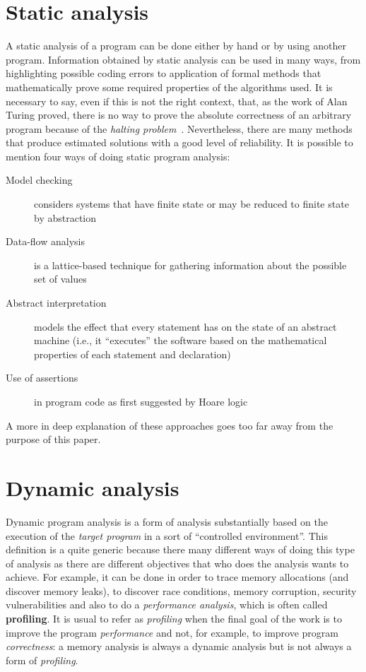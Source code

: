 \documentclass[a4paper,10pt]{report}
\begin{document}
\section{Static analysis}

A static analysis of a program can be done either by hand or by using another program.
Information obtained by static analysis can be used in many ways, from
highlighting possible coding errors to application of formal methods that
mathematically prove some required properties of the algorithms used. It is
necessary to say, even if this is not the right context, that, as the work of
Alan Turing proved, there is no way to prove the absolute
correctness of an arbitrary program because of the \emph{halting
problem}~\cite{Turing01}.
Nevertheless, there are many methods that produce estimated solutions with a
good level of reliability. It is possible to mention four ways of doing static program
analysis:

\begin{description}
\item[Model checking] considers systems that have finite state or may be reduced to finite state by abstraction
\item[Data-flow analysis] is a lattice-based technique for gathering information about the possible set of values
\item[Abstract interpretation] models the effect that every statement has on the
state of an abstract machine (i.e., it ``executes'' the software based on the
mathematical properties of each statement and declaration)
\item[Use of assertions] in program code as first suggested by Hoare
logic~\cite{Hoare01}
\end{description}

\noindent
A more in deep explanation of these approaches goes too far away from the purpose of this paper.

\section{Dynamic analysis}

Dynamic program analysis is a form of analysis substantially based on the execution of the \emph{target program} in a sort of ``controlled environment''.
This definition is a quite generic because there many different ways of doing
this type of analysis as there are different objectives that who does the
analysis wants to achieve. For example, it can be done in order to trace memory
allocations (and discover memory leaks), to discover race conditions, memory
corruption, security vulnerabilities and also to do a \emph{performance
analysis}, which is often called \textbf{profiling}. It is usual to refer as \emph{profiling} when
the final goal of the work is to improve the program  \emph{performance} and
not, for example, to improve program \emph{correctness}: a memory analysis
is always a dynamic analysis but is not always a form of \emph{profiling}.
\end{document}
